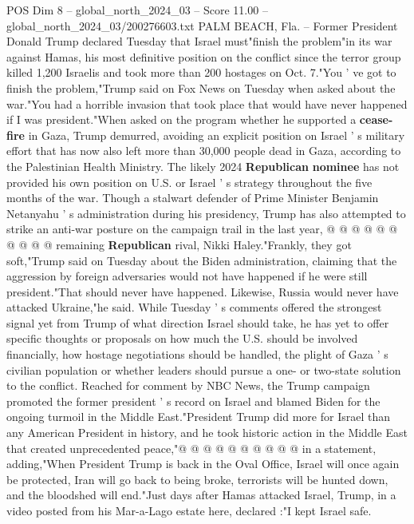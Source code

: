 \begin{textsample}{POS Dim 8 – global\_north\_2024\_03 – Score 11.00 – global\_north\_2024\_03/200276603.txt}  \label{ex:f8_pos_017}
PALM BEACH, Fla. -- Former President Donald Trump declared Tuesday that Israel must"finish the problem"in its war against Hamas, his most definitive position on the conflict since the terror group killed 1,200 Israelis and took more than 200 hostages on Oct. 7."You ' ve got to finish the problem,"Trump said on Fox News on Tuesday when asked about the war."You had a horrible invasion that took place that would have never happened if I was president."When asked on the program whether he supported a \textbf{cease-fire} in Gaza, Trump demurred, avoiding an explicit position on Israel ' s military effort that has now also left more than 30,000 people dead in Gaza, according to the Palestinian Health Ministry.
The likely 2024 \textbf{Republican} \textbf{nominee} has not provided his own position on U.S. or Israel ' s strategy throughout the five months of the war.
Though a stalwart defender of Prime Minister Benjamin Netanyahu ' s administration during his presidency, Trump has also attempted to strike an anti-war posture on the campaign trail in the last year, @ @ @ @ @ @ @ @ @ @ remaining \textbf{Republican} rival, Nikki Haley."Frankly, they got soft,"Trump said on Tuesday about the Biden administration, claiming that the aggression by foreign adversaries would not have happened if he were still president."That should never have happened.
Likewise, Russia would never have attacked Ukraine,"he said.
While Tuesday ' s comments offered the strongest signal yet from Trump of what direction Israel should take, he has yet to offer specific thoughts or proposals on how much the U.S. should be involved financially, how hostage negotiations should be handled, the plight of Gaza ' s civilian population or whether leaders should pursue a one- or two-state solution to the conflict.
Reached for comment by NBC News, the Trump campaign promoted the former president ' s record on Israel and blamed Biden for the ongoing turmoil in the Middle East."President Trump did more for Israel than any American President in history, and he took historic action in the Middle East that created unprecedented peace,"@ @ @ @ @ @ @ @ @ @ in a statement, adding,"When President Trump is back in the Oval Office, Israel will once again be protected, Iran will go back to being broke, terrorists will be hunted down, and the bloodshed will end."Just days after Hamas attacked Israel, Trump, in a video posted from his Mar-a-Lago estate here, declared :"I kept Israel safe.

\end{textsample}
